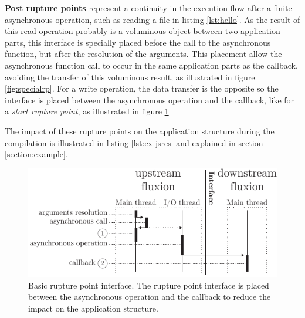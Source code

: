 \textbf{Post rupture points} represent a continuity in the execution flow after a finite asynchronous operation, such as reading a file in listing \ref{lst:hello}.
As the result of this read operation probably is a voluminous object between two application parts, this interface is specially placed before the call to the asynchronous function, but after the resolution of the arguments.
This placement allow the asynchronous function call to occur in the same application parts as the callback, avoiding the transfer of this voluminous result, as illustrated in figure \ref{fig:specialrp}.
For a write operation, the data transfer is the opposite so the interface is placed between the asynchronous operation and the callback, like for a \textit{start rupture point}, as illustrated in figure \ref{fig:basicrp}

The impact of these rupture points on the application structure during the compilation is illustrated in listing \ref{lst:ex-jsres} and explained in section \ref{section:example}.

\begin{figure}[h!]
\begin{center}
  \includegraphics[width=\linewidth]{ressources/basicrp.pdf}
  \caption{Basic rupture point interface. \textnormal{The rupture point interface is placed between the asynchronous operation and the callback to reduce the impact on the application structure.}}
  \label{fig:basicrp}
\end{center}
\end{figure}

